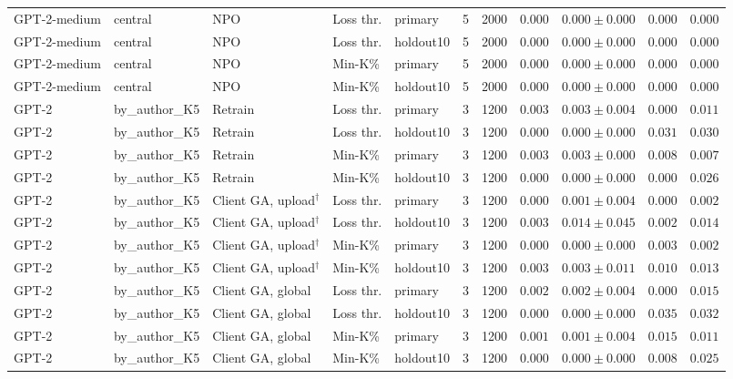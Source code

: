 \begin{table}[t]
\begin{tabular*}{\textwidth}{@{\extracolsep{\fill}}lllllcccccc@{}}
GPT-2-medium & central & NPO & Loss thr. & primary & 5 & 2000 & $0.000$ & $0.000 \pm 0.000$ & $0.000$ & $0.000$ \\
GPT-2-medium & central & NPO & Loss thr. & holdout10 & 5 & 2000 & $0.000$ & $0.000 \pm 0.000$ & $0.000$ & $0.000$ \\
GPT-2-medium & central & NPO & Min-K\% & primary & 5 & 2000 & $0.000$ & $0.000 \pm 0.000$ & $0.000$ & $0.000$ \\
GPT-2-medium & central & NPO & Min-K\% & holdout10 & 5 & 2000 & $0.000$ & $0.000 \pm 0.000$ & $0.000$ & $0.000$ \\
GPT-2 & by\_author\_K5 & Retrain & Loss thr. & primary & 3 & 1200 & $0.003$ & $0.003 \pm 0.004$ & $0.000$ & $0.011$ \\
GPT-2 & by\_author\_K5 & Retrain & Loss thr. & holdout10 & 3 & 1200 & $0.000$ & $0.000 \pm 0.000$ & $0.031$ & $0.030$ \\
GPT-2 & by\_author\_K5 & Retrain & Min-K\% & primary & 3 & 1200 & $0.003$ & $0.003 \pm 0.000$ & $0.008$ & $0.007$ \\
GPT-2 & by\_author\_K5 & Retrain & Min-K\% & holdout10 & 3 & 1200 & $0.000$ & $0.000 \pm 0.000$ & $0.000$ & $0.026$ \\
GPT-2 & by\_author\_K5 & Client GA, upload$^{\dagger}$ & Loss thr. & primary & 3 & 1200 & $0.000$ & $0.001 \pm 0.004$ & $0.000$ & $0.002$ \\
GPT-2 & by\_author\_K5 & Client GA, upload$^{\dagger}$ & Loss thr. & holdout10 & 3 & 1200 & $0.003$ & $0.014 \pm 0.045$ & $0.002$ & $0.014$ \\
GPT-2 & by\_author\_K5 & Client GA, upload$^{\dagger}$ & Min-K\% & primary & 3 & 1200 & $0.000$ & $0.000 \pm 0.000$ & $0.003$ & $0.002$ \\
GPT-2 & by\_author\_K5 & Client GA, upload$^{\dagger}$ & Min-K\% & holdout10 & 3 & 1200 & $0.003$ & $0.003 \pm 0.011$ & $0.010$ & $0.013$ \\
GPT-2 & by\_author\_K5 & Client GA, global & Loss thr. & primary & 3 & 1200 & $0.002$ & $0.002 \pm 0.004$ & $0.000$ & $0.015$ \\
GPT-2 & by\_author\_K5 & Client GA, global & Loss thr. & holdout10 & 3 & 1200 & $0.000$ & $0.000 \pm 0.000$ & $0.035$ & $0.032$ \\
GPT-2 & by\_author\_K5 & Client GA, global & Min-K\% & primary & 3 & 1200 & $0.001$ & $0.001 \pm 0.004$ & $0.015$ & $0.011$ \\
GPT-2 & by\_author\_K5 & Client GA, global & Min-K\% & holdout10 & 3 & 1200 & $0.000$ & $0.000 \pm 0.000$ & $0.008$ & $0.025$ \\

\end{tabular*}
\end{table}
